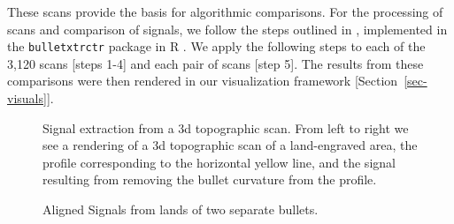 \documentclass[
  12pt]{article}
\begin{document}
These scans provide the basis for algorithmic comparisons. For the
processing of scans and comparison of signals, we follow the steps
outlined in \citet{hareAutomaticMatchingBullet2017}, implemented in the
\texttt{bulletxtrctr} package in R
\citep{hofmannBulletxtrctrAutomaticMatching2022}. We apply the following
steps to each of the 3,120 scans {[}steps 1-4{]} and each pair of scans
{[}step 5{]}. The results from these comparisons were then rendered in
our visualization framework {[}Section~\ref{sec-visuals}{]}.

\begin{figure}


\caption{\label{fig-extracted-sigs}Signal extraction from a 3d
topographic scan. From left to right we see a rendering of a 3d
topographic scan of a land-engraved area, the profile corresponding to
the horizontal yellow line, and the signal resulting from removing the
bullet curvature from the profile.}

\end{figure}%

\begin{figure}


\caption{\label{fig-aligned-sigs}Aligned Signals from lands of two
separate bullets.}

\end{figure}%
\end{document}

